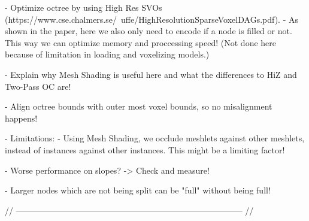 - Optimize octree by using High Res SVOs (https://www.cse.chalmers.se/~uffe/HighResolutionSparseVoxelDAGs.pdf).
    - As shown in the paper, here we also only need to encode if a node is filled or not. This way we can 
    optimize memory and proccessing speed! (Not done here because of limitation in loading and voxelizing models.)

- Explain why Mesh Shading is useful here and what the differences to HiZ and Two-Pass OC are!

- Align octree bounds with outer most voxel bounds, so no misalignment happens!
    
- Limitations: 
    - Using Mesh Shading, we occlude meshlets against other meshlets, instead of instances against other
    instances. This might be a limiting factor!

- Worse performance on slopes? -> Check and measure!

- Larger nodes which are not being split can be "full" without being full!

// --------------------------------------------------------------------------------- //
